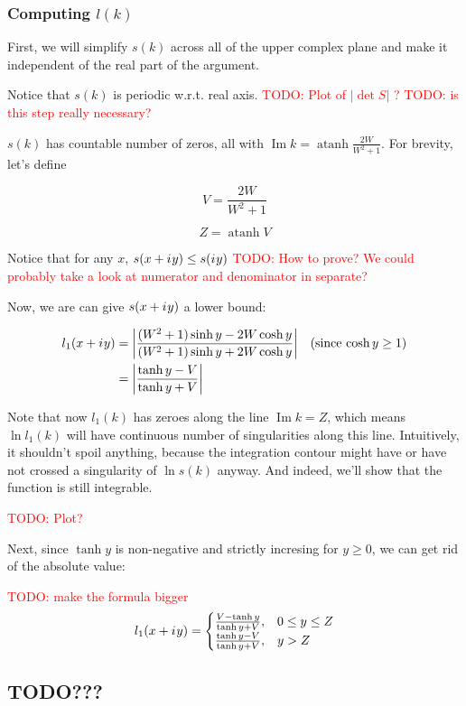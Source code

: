 \documentclass[12pt, a4paper]{article}
\newcommand{\abs}[1]{\left| #1 \right|}
\newcommand{\iu}{{i\mkern1mu}}
\renewcommand{\Im}{\operatorname{Im}}
\newcommand{\todo}[1]{{\large \textcolor{red}{TODO: #1}}}
\DeclareMathOperator\atanh{atanh}
\begin{document}
\subsubsection{Computing $l(k)$}
First, we will simplify $s(k)$ across all of the upper complex plane and make it independent of the real part of the argument.

Notice that $s(k)$ is periodic w.r.t. real axis.
\todo{Plot of $\abs{\det S}$ ?}
\todo{is this step really necessary?}

$s(k)$ has countable number of zeros, all with $\Im k = \atanh \frac{2 W}{W^2 + 1}$. For brevity, let's define

\[
V = \frac{2 W}{W^2 + 1}
\]

\[
Z = \atanh V
\]

Notice that for any $x$, $s(x + \iu y) \le s(\iu y)$
\todo{How to prove? We could probably take a look at numerator and denominator in separate?}

Now, we are can give $s(x + \iu y)$ a lower bound:

\begin{align*}
l_1(x + \iu y)
 &= \abs{\frac{(W^2 + 1) \sinh y - 2 W \cosh y}{(W^2 + 1) \sinh y + 2 W \cosh y}} && \text{(since $\cosh y \ge 1$)}\\
 &= \abs{\frac{\tanh y - V}{\tanh y + V}}
\end{align*}

Note that now $l_1(k)$ has zeroes along the line $\Im k = Z$, which means $\ln l_1(k)$ will have continuous number of singularities along this line. Intuitively, it shouldn't spoil anything, because the integration contour might have or have not crossed a singularity of $\ln s(k)$ anyway. And indeed, we'll show that the function is still integrable.

\todo{Plot?}

Next, since $\tanh y$ is non-negative and strictly incresing for $y \ge 0$, we can get rid of the absolute value:

\todo{make the formula bigger}
\[
l_1(x + \iu y)
 = \begin{cases}
 \frac{V - \tanh y}{\tanh y + V}, & 0 \le y \le Z \\
 \frac{\tanh y - V}{\tanh y + V}, & y > Z 
 \end{cases}
\]

\subsection*{TODO???}
\end{document}

